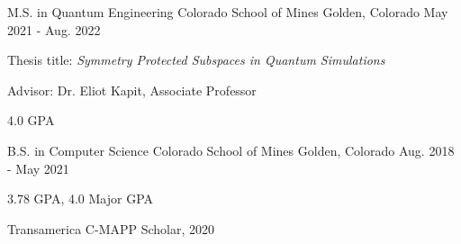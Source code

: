 

\begin{cventries}

  \cventry
    {M.S. in Quantum Engineering}
    {Colorado School of Mines}
    {Golden, Colorado}
    {May 2021 - Aug. 2022}
    {
      \begin{cvitems}
        \item{Thesis title: \emph{Symmetry Protected Subspaces in Quantum Simulations}}
        \item{Advisor: Dr. Eliot Kapit, Associate Professor}
        \item{4.0 GPA}
      \end{cvitems}
    }

  \cventry
      {B.S. in Computer Science}
      {Colorado School of Mines}
      {Golden, Colorado}
      {Aug. 2018 - May 2021}
      {
        \begin{cvitems}
          \item{3.78 GPA, 4.0 Major GPA}
          \item{Transamerica C-MAPP Scholar, 2020}
        \end{cvitems}
      }

\end{cventries}

